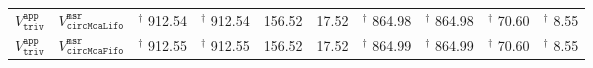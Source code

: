 \begin{tabular}{llrrrrrrrr}
  $V^{\mathtt{app}}_{\mathtt{triv}}$ & $V^{\mathtt{msr}}_{\mathtt{circMcaLifo}}$ &  \(^{\dag}\)  912.54 &  \(^{\dag}\)  912.54 & 156.52 & 17.52 &  \(^{\dag}\)  864.98 &  \(^{\dag}\)  864.98 &  \(^{\dag}\)  70.60 &  \(^{\dag}\)  8.55 \\ 
  $V^{\mathtt{app}}_{\mathtt{triv}}$ & $V^{\mathtt{msr}}_{\mathtt{circMcaFifo}}$ &  \(^{\dag}\)  912.55 &  \(^{\dag}\)  912.55 & 156.52 & 17.52 &  \(^{\dag}\)  864.99 &  \(^{\dag}\)  864.99 &  \(^{\dag}\)  70.60 &  \(^{\dag}\)  8.55 \\ 
   \hline
\end{tabular}
